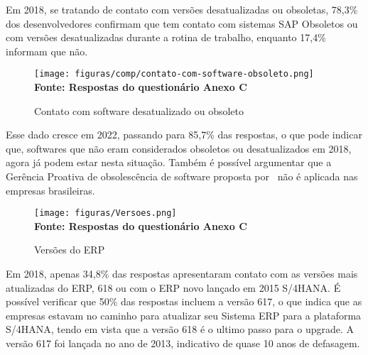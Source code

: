 Em 2018, se tratando de contato com versões desatualizadas ou obsoletas, 78,3\% dos desenvolvedores confirmam que tem contato com sistemas SAP Obsoletos ou com versões desatualizadas durante a rotina de trabalho, enquanto 17,4\% informam que não.

\begin{figure}[ht]
	\centering	
	\caption[\hspace{0.1cm}Q1.]{Contato com software desatualizado ou obsoleto}
	\vspace{-0.4cm}
	\texttt{[image: figuras/comp/contato-com-software-obsoleto.png]}
	\vspace{-0.2cm}
	\\\textbf{\footnotesize Fonte: Respostas do questionário Anexo C }	
	\label{fig:figura4}
\end{figure}

Esse dado cresce em 2022, passando para 85,7\% das respostas, o que pode indicar que, softwares que não eram considerados obsoletos ou desatualizados em 2018, agora já podem estar nesta situação. Também é possível argumentar que a Gerência Proativa de obsolescência de software proposta por~ não é aplicada nas empresas brasileiras.
\newpage
\begin{figure}[ht]
	\centering	
	\caption[\hspace{0.1cm}Q1.]{Versões do ERP}
	\vspace{-0.4cm}
	\texttt{[image: figuras/Versoes.png]}
	\vspace{-0.2cm}
	\\\textbf{\footnotesize Fonte: Respostas do questionário Anexo C}	
	\label{fig:pergunta-5}
\end{figure}
\vspace{-0.5cm}

Em 2018, apenas 34,8\% das respostas apresentaram contato com as versões mais atualizadas do ERP, 618 ou com o ERP novo lançado em 2015 S/4HANA. É possível verificar que 50\% das respostas incluem a versão 617, o que indica que as empresas estavam no caminho para atualizar seu Sistema ERP para a plataforma S/4HANA, tendo em vista que a versão 618 é o ultimo passo para o upgrade.
A versão 617 foi lançada no ano de 2013, indicativo de quase 10 anos de defasagem.

